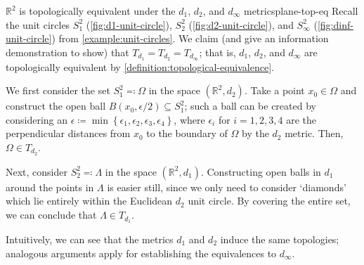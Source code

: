 \documentclass{article}
\numberwithin{equation}{section}
\numberwithin{figure}{section}
\begin{document}
\begin{example}{\texorpdfstring{$ \mathbb{R}^2 $}{The plane} is topologically
        equivalent under the \texorpdfstring{$ d_1 $, $ d_2 $, and $ d_\infty
        $}{standard} metrics}{plane-top-eq}
    Recall the unit circles $ S_1^2 $ (\cref{fig:d1-unit-circle}), $ S_2^2 $
    (\cref{fig:d2-unit-circle}), and $ S_\infty^2 $
    (\cref{fig:dinf-unit-circle}) from \cref{example:unit-circles}. We claim
    (and give an information demonstration to show) that $ T_{d_1} = T_{d_2} =
    T_{d_\infty} $; that is, $ d_1 $, $ d_2 $, and $ d_\infty $ are
    topologically equivalent by \cref{definition:topological-equivalence}.

    We first consider the set $ S_1^2 \eqcolon \Omega $ in the space $
    \left(\mathbb{R}^2, d_2\right) $. Take a point $ x_0 \in \Omega $ and
    construct the open ball $ B(x_0, \epsilon/2) \subseteq S_1^2 $; such a ball
    can be created by considering an $ \epsilon \coloneq \min\left\{ \epsilon_1,
    \epsilon_2, \epsilon_3, \epsilon_4 \right\} $, where $ \epsilon_i $ for $ i
    = 1, 2, 3, 4 $ are the perpendicular distances from $ x_0 $ to the boundary
    of $ \Omega $ by the $ d_2 $ metric. Then, $ \Omega \in T_{d_2} $.

    Next, consider $ S_2^2 \eqcolon \Lambda $ in the space $ \left(\mathbb{R}^2,
    d_1\right) $. Constructing open balls in $ d_1 $ around the points in $
    \Lambda $ is easier still, since we only need to consider `diamonds' which
    lie entirely within the Euclidean $ d_2 $ unit circle. By covering the
    entire set, we can conclude that $ \Lambda \in T_{d_1} $.

    Intuitively, we can see that the metrics $ d_1 $ and $ d_2 $ induce the same
    topologies; analogous arguments apply for establishing the equivalences to $
    d_\infty $.


\end{example}
\end{document}

